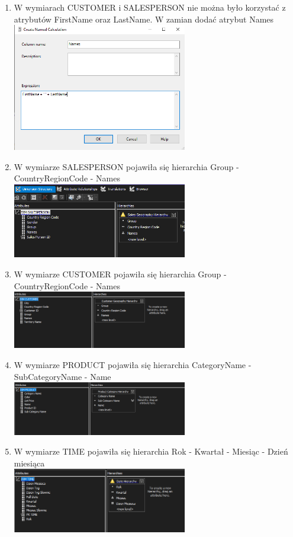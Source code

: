 \documentclass[a4paper,12pt]{article}
\begin{document}
\begin{enumerate}
  \item W wymiarach CUSTOMER i SALESPERSON nie można było korzystać z atrybutów FirstName oraz LastName. W zamian dodać atrybut Names\\
        \includegraphics[width=0.6\textwidth]{1a1.png}

  \item W wymiarze SALESPERSON pojawiła się hierarchia Group - CountryRegionCode - Names\\
        \includegraphics[width=0.6\textwidth]{1a2.png}

  \item W wymiarze CUSTOMER pojawiła się hierarchia Group - CountryRegionCode - Names\\
        \includegraphics[width=0.6\textwidth]{1a3.png}

  \item W wymiarze PRODUCT pojawiła się hierarchia CategoryName - SubCategoryName - Name\\
        \includegraphics[width=0.6\textwidth]{1a4.png}

  \item W wymiarze TIME pojawiła się hierarchia Rok - Kwartał - Miesiąc - Dzień miesiąca\\
        \includegraphics[width=0.6\textwidth]{1a5.png}
\end{enumerate}
\end{document}
